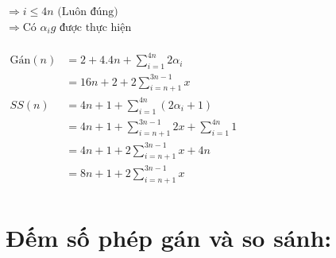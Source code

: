 \documentclass[12pt, letterpaper]{article}
\begin{document}
$\Rightarrow i \leq 4n \text{ (Luôn đúng)}$\\
$\Rightarrow \text{Có } \alpha_i g \text{ được thực hiện }$  \\
 \\
$ \begin{aligned}
		\text{Gán}(n) & = 2 + 4.4n + \sum^{4n}_{i = 1} 2 \alpha_i                   \\
		              & = 16n + 2 + 2 \sum^{3n-1}_{i = n + 1} x                     \\
		SS(n)         & = 4n + 1 + \sum^{4n}_{i = 1} (2 \alpha_i + 1)               \\
		              & = 4n + 1 + \sum^{3n-1}_{i = n + 1} 2x + \sum^{4n}_{i = 1} 1 \\
		              & = 4n + 1 + 2\sum^{3n-1}_{i = n + 1} x + 4n                  \\
		              & = 8n + 1 + 2\sum^{3n-1}_{i = n + 1} x                       \\
	\end{aligned} $ \\
\section{Đếm số phép gán và so sánh:}
\end{document}
